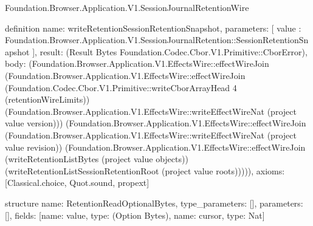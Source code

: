 \begin{lexlean}{Foundation.Browser.Application.V1.SessionJournalRetentionWire}
\begin{semanticmodule}
definition{
  name: writeRetentionSessionRetentionSnapshot,
  parameters: [
    value : Foundation.Browser.Application.V1.SessionJournalRetention::SessionRetentionSnapshot
  ],
  result: (Result Bytes Foundation.Codec.Cbor.V1.Primitive::CborError),
  body: (Foundation.Browser.Application.V1.EffectsWire::effectWireJoin (Foundation.Browser.Application.V1.EffectsWire::effectWireJoin (Foundation.Codec.Cbor.V1.Primitive::writeCborArrayHead 4 (retentionWireLimits)) (Foundation.Browser.Application.V1.EffectsWire::writeEffectWireNat (project value version))) (Foundation.Browser.Application.V1.EffectsWire::effectWireJoin (Foundation.Browser.Application.V1.EffectsWire::writeEffectWireNat (project value revision)) (Foundation.Browser.Application.V1.EffectsWire::effectWireJoin (writeRetentionListBytes (project value objects)) (writeRetentionListSessionRetentionRoot (project value roots))))),
  axioms: [Classical.choice, Quot.sound, propext]
}

structure{
  name: RetentionReadOptionalBytes,
  type_parameters: [],
  parameters: [],
  fields: [{name: value, type: (Option Bytes)}, {name: cursor, type: Nat}]
}


\end{semanticmodule}
\end{lexlean}
